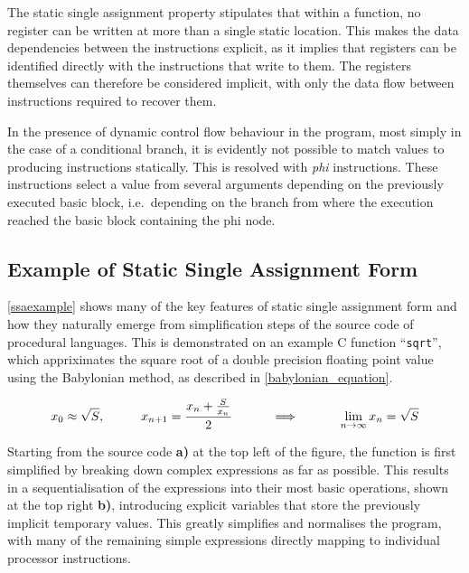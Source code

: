     The static single assignment property stipulates that within a function,
    no register can be written at more than a single static location.
    This makes the data dependencies between the instructions explicit, as it
    implies that registers can be identified directly with the instructions that
    write to them.
    The registers themselves can therefore be considered implicit, with only the
    data flow between instructions required to recover them.

    In the presence of dynamic control flow behaviour in the program, most
    simply in the case of a conditional branch, it is evidently not possible to
    match values to producing instructions statically.
    This is resolved with {\em phi} instructions.
    These instructions select a value from several arguments depending on the
    previously executed basic block, i.e.\ depending on the branch from where
    the execution reached the basic block containing the phi node.

\subsection{Example of Static Single Assignment Form}

    \autoref{ssaexample} shows many of the key features of static single
    assignment form and how they naturally emerge from simplification steps of
    the source code of procedural languages.
    This is demonstrated on an example C function ``{\tt sqrt}'',
    which  appriximates the square root of a double precision floating point
    value using the Babylonian method, as described in
    \autoref{babylonian_equation}.

\begin{equation}
    x_0\approx\sqrt{S},\text{\hspace{1cm}}
    x_{n+1}=\frac{x_n+\frac{S}{x_n}}{2}\text{\hspace{1cm}}
    \implies\text{\hspace{1cm}}
    \lim_{n\rightarrow\infty}x_n=\sqrt{S}
    \label{babylonian_equation}
\end{equation}

    Starting from the source code {\bf a)} at the top left of the figure, the
    function is first simplified by breaking down complex expressions as far as
    possible.
    This results in a sequentialisation of the expressions into their
    most basic operations, shown at the top right {\bf b)}, introducing
    explicit variables that store the previously implicit temporary values.
    This greatly simplifies and normalises the program, with many of the
    remaining simple expressions directly mapping to individual processor
    instructions.

